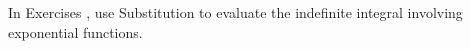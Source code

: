 {\noindent In Exercises}
{, use Substitution to evaluate the indefinite integral involving exponential functions.}
